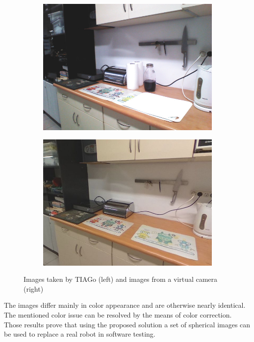 \documentclass{svproc}
\begin{document}
\begin{figure}[!ht]
    \begin{subfigure}{0.46\textwidth}
        \centering
        \includegraphics[width=\linewidth]{img/sim_vs_tiago/tia_kuchnia_blat.jpg}
        \caption{}
        \vspace*{1em}
    \end{subfigure}\hfill%
    \begin{subfigure}{0.46\textwidth}
        \centering
        \includegraphics[width=\linewidth]{img/sim_vs_tiago/sim_kuchnia_blat.jpg}
        \caption{}
        \vspace*{1em}
    \end{subfigure}
    \caption{Images taken by TIAGo (left) and images from a virtual camera (right)}
    \label{fig:sim_vs_tiago}
\end{figure}

The images differ mainly in color appearance and are otherwise nearly identical.
The mentioned color issue can be resolved by the means of color correction.
Those results prove that using the proposed solution a set of spherical images can be used to replace a real robot in software testing.

\clearpage



\end{document}
